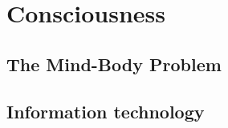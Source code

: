 \section{Consciousness}
\label{sec:Consciousness}


\subsection{The Mind-Body Problem}


\subsection{Information technology}
